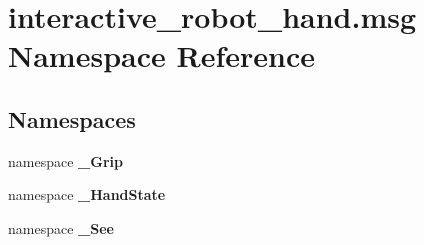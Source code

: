 \section{interactive\-\_\-robot\-\_\-hand.\-msg Namespace Reference}
\label{namespaceinteractive__robot__hand_1_1msg}
\subsection*{Namespaces}
\begin{DoxyCompactItemize}
\item 
namespace {\bf \-\_\-\-Grip}
\item 
namespace {\bf \-\_\-\-Hand\-State}
\item 
namespace {\bf \-\_\-\-See}
\end{DoxyCompactItemize}
